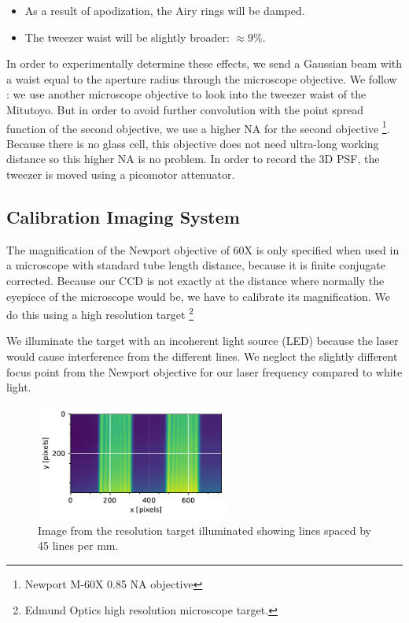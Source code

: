 \begin{itemize}
    \item As a result of apodization, the Airy rings will be damped. 
    \item The tweezer waist will be slightly broader: $\approx 9\%$.
\end{itemize}

In order to experimentally determine these effects, we send a Gaussian beam with a waist equal to the aperture radius through the microscope objective. We follow \cite{Baumgaertner2017}: we use another microscope objective to look into the tweezer waist of the Mitutoyo. But in order to avoid further convolution with the point spread function of the second objective, we use a higher NA for the second objective \footnote{Newport M-60X 0.85 NA objective}. Because there is no glass cell, this objective does not need ultra-long working distance so this higher NA is no problem. In order to record the 3D PSF, the tweezer is moved using a picomotor attenuator. 

\subsection{Calibration Imaging System}

The magnification of the Newport objective of 60X is only specified when used in a microscope with standard tube length distance, because it is finite conjugate corrected. Because our CCD is not exactly at the distance where normally the eyepiece of the microscope would be, we have to calibrate its magnification. We do this using a high resolution target \footnote{Edmund Optics high resolution microscope target.} 

We illuminate the target with an incoherent light source (LED) because the laser would cause interference from the different lines. We neglect the slightly different focus point from the Newport objective for our laser frequency compared to white light. 

\begin{figure}
    \centering
    \includegraphics[width = 2.5in]{figures/linespacing.pdf}
    \caption{Image from the resolution target illuminated showing lines spaced by 45 lines per mm.}
    \label{fig:resolutionTarget}
\end{figure}

